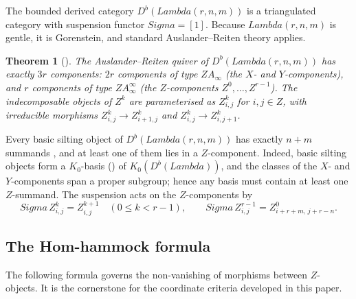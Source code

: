\documentclass[11pt, a4paper]{article}
\newtheorem{theorem}{Theorem}[section]
\theoremstyle{definition}
\def\Lambda{Lambda}%
\def\Sigma{Sigma}%
\def\mathbb#1{#1}%
\def\mathcal#1{#1}%
\def\Db{D^b}%
\newcommand{\Db}{\mathcal{D}^b}
\begin{document}
The bounded derived category $\Db(\Lambda(r,n,m))$ is a triangulated category with suspension functor $\Sigma=[1]$. Because $\Lambda(r,n,m)$ is gentle, it is Gorenstein, and standard Auslander--Reiten theory applies.

\begin{theorem}[{\cite[Theorem~B]{BGS2004}}]\label{thm:AR-structure}
The Auslander--Reiten quiver of $\Db(\Lambda(r,n,m))$ has exactly $3r$ components: $2r$ components of type $\mathbb{Z}A_\infty$ (the $\mathcal{X}$- and $\mathcal{Y}$-components), and $r$ components of type $\mathbb{Z}A_\infty^\infty$ (the $\mathcal{Z}$-components $\mathcal{Z}^0,\dots,\mathcal{Z}^{r-1}$). The indecomposable objects of $\mathcal{Z}^k$ are parameterised as $Z_{i,j}^k$ for $i,j\in\mathbb{Z}$, with irreducible morphisms $Z_{i,j}^k\to Z_{i+1,j}^k$ and $Z_{i,j}^k\to Z_{i,j+1}^k$.
\end{theorem}

Every basic silting object of $\Db(\Lambda(r,n,m))$ has exactly $n+m$ summands \cite{BPP2017}, and at least one of them lies in a $\mathcal{Z}$-component. Indeed, basic silting objects form a $K_0$-basis () of $K_0(\Db(\Lambda))$, and the classes of the $\mathcal{X}$- and $\mathcal{Y}$-components span a proper subgroup; hence any basis must contain at least one $\mathcal{Z}$-summand. The suspension acts on the $\mathcal{Z}$-components by
\begin{equation}\label{eq:sigma-action}
\Sigma\,Z_{i,j}^k = Z_{i,j}^{k+1}\quad (0\le k<r-1),\qquad
\Sigma\,Z_{i,j}^{r-1} = Z_{i+r+m,\,j+r-n}^0.
\end{equation}

\subsection{The Hom-hammock formula}
\label{subsec:prelim-hammock}

The following formula governs the non-vanishing of morphisms between $\mathcal{Z}$-objects. It is the cornerstone for the coordinate criteria developed in this paper.
\end{document}
